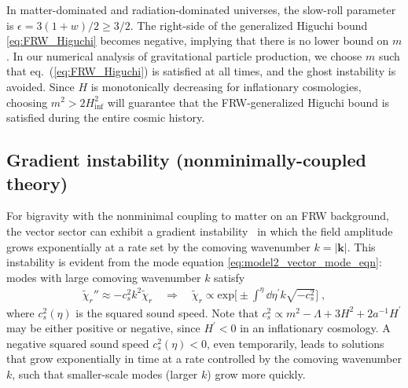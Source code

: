 \documentclass[11pt,a4paper]{article}
\newcommand{\ba}[1]{\begin{align} #1 \end{align}}
\newcommand{\kvec}{{\bm k}}
\newcommand{\eref}[1]{eq.~(\ref{#1})}
\begin{document}
In matter-dominated and radiation-dominated universes, the slow-roll parameter is $\epsilon = 3(1+w)/2 \geq 3/2$.  The right-side of the generalized Higuchi bound \eqref{eq:FRW_Higuchi} becomes negative, implying that there is no lower bound on $m$.  In our numerical analysis of gravitational particle production, we choose $m$ such that \eref{eq:FRW_Higuchi} is satisfied at all times, and the ghost instability is avoided.  Since $H$ is monotonically decreasing for inflationary cosmologies, choosing $m^2 > 2 H_\mathrm{inf}^2$ will guarantee that the FRW-generalized Higuchi bound is satisfied during the entire cosmic history. 

\subsection{Gradient instability (nonminimally-coupled theory)}
\label{sub:gradient_instability}

For bigravity with the nonminimal coupling to matter on an FRW background, the vector sector can exhibit a gradient instability~\cite{Comelli:2015pua,Gumrukcuoglu:2015nua} in which the field amplitude grows exponentially at a rate set by the comoving wavenumber $k = |\kvec|$.  This instability is evident from the mode equation \eqref{eq:model2_vector_mode_eqn}: modes with large comoving wavenumber $k$ satisfy 
\ba{
    \tilde{\chi}_r'' \approx - c_s^2 k^2 \tilde{\chi}_r 
    \quad \Rightarrow \quad 
    \tilde{\chi}_r \propto \mathrm{exp}\biggl[ \pm \int^\eta \! \dd{\eta^\prime} k \sqrt{- c_s^2} \biggr]
    \;,
}
where $c_s^2(\eta)$ is the squared sound speed.  Note that $c_s^2 \propto m^2 - \Lambda + 3 H^2 + 2 a^{-1} H^\prime$ may be either positive or negative, since $H^\prime < 0$ in an inflationary cosmology.  A negative squared sound speed $c_s^2(\eta) < 0$, even temporarily, leads to solutions that grow exponentially in time at a rate controlled by the comoving wavenumber $k$, such that smaller-scale modes (larger $k$) grow more quickly.  
\end{document}
